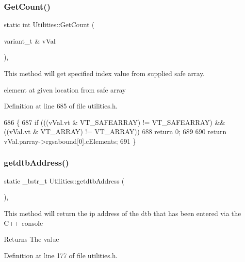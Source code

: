 \subsubsection{\texorpdfstring{Get\+Count()}{GetCount()}}
{\footnotesize\ttfamily static int Utilities\+::\+Get\+Count (\begin{DoxyParamCaption}\item[{variant\+\_\+t \&}]{v\+Val }\end{DoxyParamCaption})\hspace{0.3cm}{\ttfamily [inline]}, {\ttfamily [static]}}

This method will get specified index value from supplied safe array.

element at given location from safe array 

Definition at line 685 of file utilities.\+h.


\begin{DoxyCode}
686     \{
687         \textcolor{keywordflow}{if} (((vVal.vt & VT\_SAFEARRAY) != VT\_SAFEARRAY) && ((vVal.vt & VT\_ARRAY) != VT\_ARRAY))
688             \textcolor{keywordflow}{return} 0;
689 
690         \textcolor{keywordflow}{return} vVal.parray->rgsabound[0].cElements;
691     \}
\end{DoxyCode}
\mbox{\label{class_utilities_aeb41a986f419ffd74a7a499562c19e09_aeb41a986f419ffd74a7a499562c19e09}} 
\subsubsection{\texorpdfstring{getdtb\+Address()}{getdtbAddress()}}
{\footnotesize\ttfamily static \+\_\+bstr\+\_\+t Utilities\+::getdtb\+Address (\begin{DoxyParamCaption}{ }\end{DoxyParamCaption})\hspace{0.3cm}{\ttfamily [inline]}, {\ttfamily [static]}}

This method will return the ip address of the dtb that has been entered via the C++ console

\begin{DoxyReturn}{Returns}
The value 
\end{DoxyReturn}


Definition at line 177 of file utilities.\+h.


